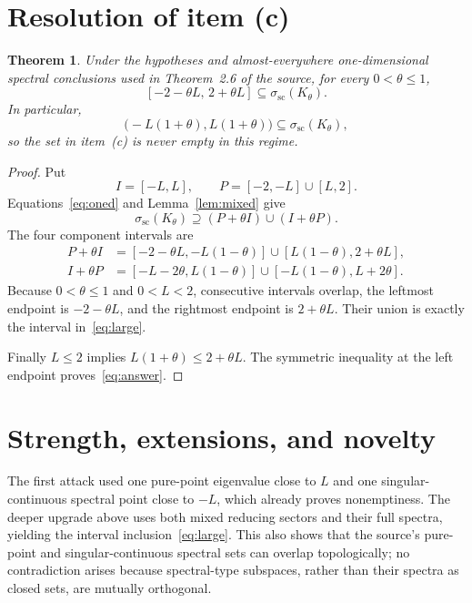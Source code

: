 \documentclass[11pt,a4paper]{article}
\newtheorem{theorem}{Theorem}
\begin{document}
\section{Resolution of item (c)}

\begin{theorem}\label{thm:main}
Under the hypotheses and almost-everywhere one-dimensional spectral
conclusions used in Theorem~2.6 of the source, for every $0<\theta\leq1$,
\begin{equation}\label{eq:large}
 [-2-\theta L,\,2+\theta L]
 \subseteq \sigma_{\mathrm{sc}}(K_\theta).
\end{equation}
In particular,
\begin{equation}\label{eq:answer}
 \bigl(-L(1+\theta),L(1+\theta)\bigr)
 \subseteq \sigma_{\mathrm{sc}}(K_\theta),
\end{equation}
so the set in item~(c) is never empty in this regime.
\end{theorem}

\begin{proof}
Put
\[
 I=[-L,L],\qquad P=[-2,-L]\cup[L,2].
\]
Equations~\eqref{eq:oned} and Lemma~\ref{lem:mixed} give
\[
 \sigma_{\mathrm{sc}}(K_\theta)
 \supseteq (P+\theta I)\cup(I+\theta P).
\]
The four component intervals are
\begin{align*}
 P+\theta I
   &=[-2-\theta L,-L(1-\theta)]
     \cup[L(1-\theta),2+\theta L],\\
 I+\theta P
   &=[-L-2\theta,L(1-\theta)]
     \cup[-L(1-\theta),L+2\theta].
\end{align*}
Because $0<\theta\leq1$ and $0<L<2$, consecutive intervals overlap, the
leftmost endpoint is $-2-\theta L$, and the rightmost endpoint is
$2+\theta L$.  Their union is exactly the interval in~\eqref{eq:large}.

Finally $L\leq2$ implies
$L(1+\theta)\leq2+\theta L$.  The symmetric inequality at the left endpoint
proves~\eqref{eq:answer}.
\end{proof}

\section{Strength, extensions, and novelty}

The first attack used one pure-point eigenvalue close to $L$ and one
singular-continuous spectral point close to $-L$, which already proves
nonemptiness.  The deeper upgrade above uses both mixed reducing sectors and
their full spectra, yielding the interval inclusion~\eqref{eq:large}.  This
also shows that the source's pure-point and singular-continuous spectral sets
can overlap topologically; no contradiction arises because spectral-type
subspaces, rather than their spectra as closed sets, are mutually orthogonal.
\end{document}
